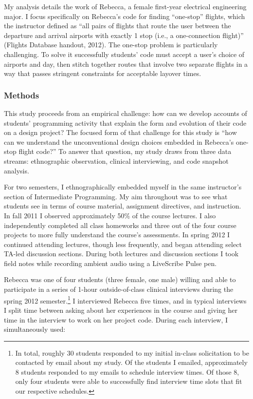 My analysis details the work of Rebecca, a female first-year electrical
engineering major. I focus specifically on Rebecca's code for finding
``one-stop'' flights, which the instructor defined as ``all pairs of
ﬂights that route the user between the departure and arrival airports
with exactly 1 stop (i.e., a one-connection ﬂight)'' (Flights Database
handout, 2012). The one-stop problem is particularly challenging. To
solve it successfully students' code must accept a user's choice of
airports and day, then stitch together routes that involve two separate
flights in a way that passes stringent constraints for acceptable
layover times.

\subsubsection{Methods}\label{methods}

This study proceeds from an empirical challenge: how can we develop
accounts of students' programming activity that explain the form and
evolution of their code on a design project? The focused form of that
challenge for this study is ``how can we understand the unconventional
design choices embedded in Rebecca's one-stop flight code?'' To answer
that question, my study draws from three data streams: ethnographic
observation, clinical interviewing, and code snapshot analysis.

For two semesters, I ethnographically embedded myself in the same
instructor's section of Intermediate Programming. My aim throughout was
to see what students see in terms of course material, assignment
directives, and instruction. In fall 2011 I observed approximately 50\%
of the course lectures. I also independently completed all class
homeworks and three out of the four course projects to more fully
understand the course's assessments. In spring 2012 I continued
attending lectures, though less frequently, and began attending select
TA-led discussion sections. During both lectures and discussion sections
I took field notes while recording ambient audio using a LiveScribe
Pulse pen.

Rebecca was one of four students (three female, one male) willing and
able to participate in a series of 1-hour outside-of-class clinical
interviews during the spring 2012 semester.\footnote{In total, roughly
  30 students responded to my initial in-class solicitation to be
  contacted by email about my study. Of the students I emailed,
  approximately 8 students responded to my emails to schedule interview
  times. Of those 8, only four students were able to successfully find
  interview time slots that fit our respective schedules.} I interviewed
Rebecca five times, and in typical interviews I split time between
asking about her experiences in the course and giving her time in the
interview to work on her project code. During each interview, I
simultaneously used:

